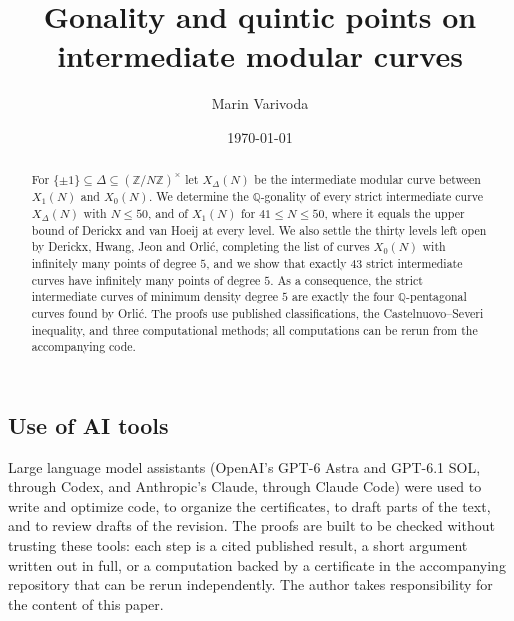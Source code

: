 \documentclass[11pt]{amsart}
\newcommand{\Q}{\mathbb{Q}}
\newcommand{\Z}{\mathbb{Z}}
\theoremstyle{definition}
\theoremstyle{remark}
\begin{document}
\title{Gonality and quintic points on intermediate modular curves}
\author{Marin Varivoda}
\address{Department of Mathematics, Faculty of Science, University of Zagreb, Bijeni\v{c}ka cesta 30, 10000 Zagreb, Croatia}
\date{\today}

\begin{abstract}
For $\{\pm1\}\subseteq\Delta\subseteq(\Z/N\Z)^\times$ let $X_\Delta(N)$ be the intermediate modular curve
between $X_1(N)$ and $X_0(N)$. We determine the $\Q$-gonality of every strict intermediate curve $X_\Delta(N)$
with $N\le 50$, and of $X_1(N)$ for $41\le N\le 50$, where it equals the upper bound of Derickx and van Hoeij
at every level. We also settle the thirty levels left open by Derickx, Hwang, Jeon and Orli\'c, completing the
list of curves $X_0(N)$ with infinitely many points of degree $5$, and we show that exactly $43$ strict
intermediate curves have infinitely many points of degree $5$. As a consequence, the strict intermediate curves
of minimum density degree $5$ are exactly the four $\Q$-pentagonal curves found by Orli\'c. The proofs use published
classifications, the Castelnuovo--Severi inequality, and three computational methods; all computations can be
rerun from the accompanying code.
\end{abstract}

\maketitle










\subsection*{Use of AI tools}
Large language model assistants (OpenAI's GPT-6 Astra and GPT-6.1 SOL, through Codex, and Anthropic's Claude, through
Claude Code) were used to write and optimize code, to organize the certificates, to draft parts of the text, and to
review drafts of the revision. The proofs
are built to be checked without trusting these tools: each step is a cited published result, a short
argument written out in full, or a computation backed by a certificate in the accompanying repository that can be rerun independently. The author
takes responsibility for the content of this paper.




\appendix

\end{document}

